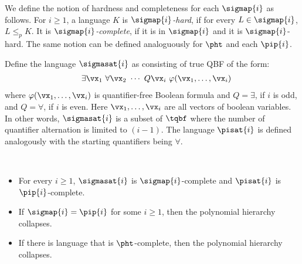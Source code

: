 \documentclass[11pt, a4paper]{article}
\begin{document}
We define the notion of hardness and completeness for each $\sigmap {i}$ as follows. 
For $i\geq 1$, a language $K$ is {\em $\sigmap {i}$-hard}, if for every $L \in \sigmap {i}$, $L \leq_p K$. 
It is {\em $\sigmap {i}$-complete}, if it is in $\sigmap {i}$ and it is $\sigmap {i}$-hard. 
The same notion can be defined analoguously for $\pht$ and each $\pip {i}$.


Define the language $\sigmasat {i}$ as consisting of true QBF of the form:
\begin{eqnarray*}
& & \exists \vx_1 \ \forall \vx_2 \ \cdots \ Q \vx_i\ \varphi(\vx_1,\ldots,\vx_i)
\end{eqnarray*}
where $\varphi(\vx_1,\ldots,\vx_i)$ is quantifier-free Boolean formula and $Q=\exists$, if $i$ is odd, and $Q=\forall$, if $i$ is even.
Here $\vx_1,\ldots,\vx_i$ are all vectors of boolean variables.
In other words, $\sigmasat {i}$ is a subset of $\tqbf$ where the number of quantifier alternation is limited to $(i-1)$.
The language $\pisat {i}$ is defined analogously with the starting quantifiers being $\forall$.

\begin{theorem}
\label{theo:ph}~
\begin{itemize}
\item 
For every $i\geq 1$,
$\sigmasat {i}$ is $\sigmap {i}$-complete and $\pisat {i}$ is $\pip {i}$-complete.
\item
If $\sigmap {i} = \pip {i}$ for some $i\geq 1$, then the polynomial hierarchy collapses.
\item
If there is language that is $\pht$-complete, then the polynomial hierarchy collapses.
\end{itemize}

\end{theorem}
\end{document}
